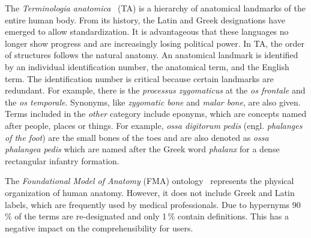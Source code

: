 \documentclass[sw]{iosart2x}
\begin{document}
The \emph{Terminologia anatomica}~\citep{ta2} (TA) is a hierarchy of anatomical landmarks of the entire human body.
From its history, the Latin and Greek designations have emerged to allow standardization.
It is advantageous that these languages no longer show progress and are increasingly losing political power.
In TA, the order of structures follows the natural anatomy.
An anatomical landmark is identified by an individual identification number, the anatomical term, and the English term.
The identification number is critical because certain landmarks are redundant.
For example, there is the \emph{processus zygomaticus} at the \emph{os frontale} and the \emph{os temporale}.
Synonyms, like \emph{zygomatic bone} and \emph{malar bone}, are also given.
Terms included in the \emph{other} category include eponyms, which are concepts named after people, places or things.
For example, \emph{ossa digitorum pedis} (engl. \emph{phalanges of the foot}) are the small bones of the toes and are also denoted as \emph{ossa phalangea pedis} which are named after the Greek word \emph{phalanx} for a dense rectangular infantry formation.

The \emph{Foundational Model of Anatomy} (FMA) ontology~\citep{fma} represents the physical organization of human anatomy.
However, it does not include Greek and Latin labels, which are frequently used by medical professionals.
Due to hypernyms 90\,\% of the terms are re-designated and only 1\,\% contain definitions.
This has a negative impact on the comprehensibility for users.
\end{document}
